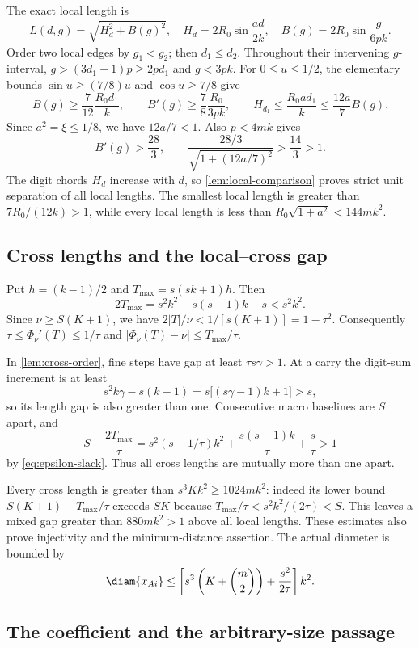The exact local length is
\[
 L(d,g)=\sqrt{H_d^2+B(g)^2},\quad
 H_d=2R_0\sin\frac{ad}{2k},\quad B(g)=2R_0\sin\frac{g}{6pk}.
\]
Order two local edges by $g_1<g_2$; then $d_1\le d_2$. Throughout their
intervening $g$-interval, $g>(3d_1-1)p\ge2pd_1$ and $g<3pk$.
For $0\le u\le1/2$, the elementary bounds $\sin u\ge(7/8)u$ and
$\cos u\ge7/8$ give
\[
 B(g)\ge\frac7{12}\frac{R_0d_1}{k},\qquad
 B'(g)\ge\frac78\frac{R_0}{3pk},\qquad
 H_{d_1}\le\frac{R_0ad_1}{k}\le\frac{12a}{7}B(g).
\]
Since $a^2=\xi\le1/8$, we have $12a/7<1$. Also $p<4mk$ gives
\[
 B'(g)>\frac{28}{3},\qquad
 \frac{28/3}{\sqrt{1+(12a/7)^2}}>\frac{14}{3}>1.
\]
The digit chords $H_d$ increase with $d$, so \cref{lem:local-comparison}
proves strict unit separation of all local lengths.
The smallest local length is greater than $7R_0/(12k)>1$, while every
local length is less than $R_0\sqrt{1+a^2}<144mk^2$.

\subsection{Cross lengths and the local--cross gap}

Put $h=(k-1)/2$ and $T_{\max}=s(sk+1)h$. Then
\[
 2T_{\max}=s^2k^2-s(s-1)k-s<s^2k^2.
\]
Since $\nu\ge S(K+1)$, we have
$2|T|/\nu<1/[s(K+1)]=1-\tau^2$. Consequently
$\tau\le\Phi_\nu'(T)\le1/\tau$ and
$|\Phi_\nu(T)-\nu|\le T_{\max}/\tau$.

In \cref{lem:cross-order}, fine steps have gap at least $\tau s\gamma>1$.
At a carry the digit-sum increment is at least
\[
 s^2k\gamma-s(k-1)=s\bigl[(s\gamma-1)k+1\bigr]>s,
\]
so its length gap is also greater than one. Consecutive macro baselines
are $S$ apart, and
\[
 S-\frac{2T_{\max}}\tau
 =s^2(s-1/\tau)k^2+\frac{s(s-1)k}\tau+\frac s\tau>1
\]
by \eqref{eq:epsilon-slack}. Thus all cross lengths are mutually more
than one apart.

Every cross length is greater than $s^3Kk^2\ge1024mk^2$:
indeed its lower bound $S(K+1)-T_{\max}/\tau$ exceeds $SK$ because
$T_{\max}/\tau<s^2k^2/(2\tau)<S$. This leaves a mixed gap greater than
$880mk^2>1$ above all local lengths. These estimates also prove injectivity
and the minimum-distance assertion. The actual diameter is bounded by
\begin{equation}\label{eq:epsilon-diameter}
 \diam\{x_{Ai}\}\le
 \left[s^3\left(K+\binom m2\right)+\frac{s^2}{2\tau}\right]k^2.
\end{equation}



\subsection{The coefficient and the arbitrary-size passage}

